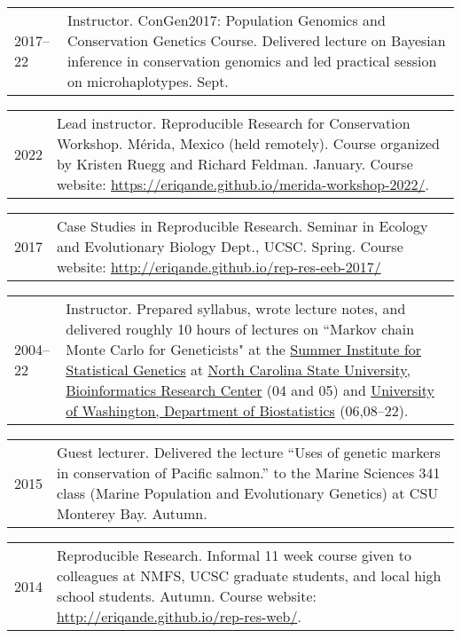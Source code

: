 \documentclass[11pt]{article}
\newlength{\myindent}
\newlength{\scndcol}
\begin{document}
\begin{tabular}{ @{}p{2.5\myindent} p{\scndcol}@{}  }
\hspace*{\myindent}2017--22 &  Instructor.  ConGen2017: Population Genomics and Conservation Genetics Course. Delivered lecture on Bayesian inference in conservation genomics and led practical session on microhaplotypes. Sept.
\end{tabular}


\begin{tabular}{ @{}p{2.5\myindent} p{\scndcol}@{}  }
\hspace*{\myindent}2022 &  Lead instructor. Reproducible Research for Conservation Workshop. Mérida, Mexico (held remotely). Course organized by Kristen Ruegg and Richard Feldman. January. Course website: \url{https://eriqande.github.io/merida-workshop-2022/}.  
\end{tabular}


\begin{tabular}{ @{}p{2.5\myindent} p{\scndcol}@{}  }
\hspace*{\myindent}2017 &  Case Studies in Reproducible Research. Seminar in Ecology and Evolutionary
Biology Dept., UCSC. Spring.  Course website: \url{http://eriqande.github.io/rep-res-eeb-2017/}
\end{tabular}


\begin{tabular}{ @{}p{2.5\myindent} p{\scndcol}@{}  }
\hspace*{\myindent}2004--22 &  Instructor.  Prepared syllabus, wrote lecture notes, and delivered roughly 10 hours of lectures on ``Markov chain Monte Carlo for Geneticists" at the \href{http://www.biostat.washington.edu/sisg06/}{Summer Institute for Statistical Genetics} at    
\href{http://statgen.ncsu.edu/brcwebsite/home.php}{North Carolina State University, Bioinformatics Research Center} (04 and 05) and \href{http://www.biostat.washington.edu/}{University of Washington, Department of Biostatistics} (06,08--22).
\end{tabular}


\begin{tabular}{ @{}p{2.5\myindent} p{\scndcol}@{}  }
\hspace*{\myindent}2015 &  Guest lecturer. Delivered the lecture ``Uses of genetic markers in conservation
of Pacific salmon.'' to the Marine Sciences 341 class (Marine Population and Evolutionary Genetics) at 
CSU Monterey Bay. Autumn.
\end{tabular}


\begin{tabular}{ @{}p{2.5\myindent} p{\scndcol}@{}  }
\hspace*{\myindent}2014 &  Reproducible Research. Informal 11 week course given to colleagues at NMFS, UCSC graduate students, and local high school students. Autumn.  Course website: \url{http://eriqande.github.io/rep-res-web/}.
\end{tabular}
\end{document}
